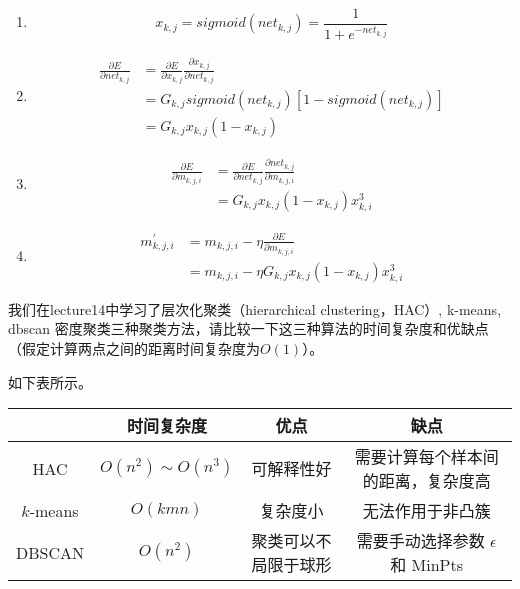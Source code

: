 \begin{solution}
    \begin{enumerate}
        \item \begin{equation*}
            x_{k,j} = sigmoid(net_{k,j}) = \frac{1}{1+e^{-net_{k,j}}}
        \end{equation*}
        \item \begin{align*}
            \frac{\partial E}{\partial net_{k,j}} &= \frac{\partial E}{\partial x_{k,j}}\frac{\partial x_{k,j}}{\partial net_{k,j}} \\
            &= G_{k,j}sigmoid(net_{k,j})[1-sigmoid(net_{k,j})] \\
            &= G_{k,j}x_{k,j}(1-x_{k,j})
        \end{align*}
        \item \begin{align*}
            \frac{\partial E}{\partial m_{k,j,i}} &= \frac{\partial E}{\partial net_{k,j}}\frac{\partial net_{k,j}}{\partial m_{k,j,i}}\\
            &= G_{k,j}x_{k,j}(1-x_{k,j})x_{k,i}^3
        \end{align*}
        \item \begin{align*}
            m_{k,j,i}^\prime &= m_{k,j,i} - \eta \frac{\partial E}{\partial m_{k,j,i}}\\
            &= m_{k,j,i} - \eta G_{k,j}x_{k,j}(1-x_{k,j})x_{k,i}^3
        \end{align*}
    \end{enumerate}
\end{solution}

\begin{problem}
    我们在lecture14中学习了层次化聚类（hierarchical clustering，HAC）, k-means,  dbscan 密度聚类三种聚类方法，请比较一下这三种算法的时间复杂度和优缺点（假定计算两点之间的距离时间复杂度为$O(1)$）。
\end{problem}

\begin{solution}
    如下表所示。

    \begin{tabular}{cccc}
        \toprule
            & \bfseries 时间复杂度  & \bfseries 优点 & \bfseries 缺点 \\
        \midrule
        HAC &  $O(n^2)\sim O(n^3)$  & 可解释性好  & 需要计算每个样本间的距离，复杂度高   \\
        $k$-means & $O(kmn)$ & 复杂度小  &  无法作用于非凸簇   \\
        DBSCAN &  $O(n^2)$  & 聚类可以不局限于球形 & 需要手动选择参数 $\epsilon$ 和 MinPts  \\
        \bottomrule
    \end{tabular}
\end{solution}

